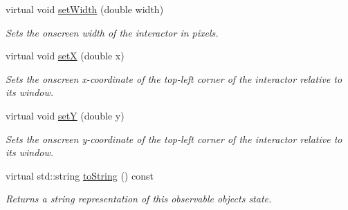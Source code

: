 \begin{DoxyCompactItemize}
virtual void \mbox{\hyperlink{classGInteractor_aa3f3fba4cb131baa8696ba01e3bceca1}{set\+Width}} (double width)
\begin{DoxyCompactList}\small\item\em Sets the onscreen width of the interactor in pixels. \end{DoxyCompactList}\item 
virtual void \mbox{\hyperlink{classGInteractor_a9c18fcc579333bf9653d13ad2b372e39}{setX}} (double x)
\begin{DoxyCompactList}\small\item\em Sets the onscreen x-\/coordinate of the top-\/left corner of the interactor relative to its window. \end{DoxyCompactList}\item 
virtual void \mbox{\hyperlink{classGInteractor_a7d57e2a5c35d27feb58fd498a3cf82b9}{setY}} (double y)
\begin{DoxyCompactList}\small\item\em Sets the onscreen y-\/coordinate of the top-\/left corner of the interactor relative to its window. \end{DoxyCompactList}\item 
virtual std\+::string \mbox{\hyperlink{classGObservable_a1fe5121d6528fdea3f243321b3fa3a49}{to\+String}} () const
\begin{DoxyCompactList}\small\item\em Returns a string representation of this observable object\textquotesingle{}s state. \end{DoxyCompactList}\end{DoxyCompactItemize}
